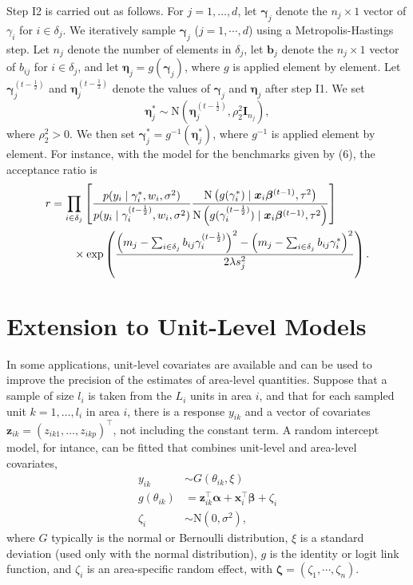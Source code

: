 \documentclass[12pt]{article}
\begin{document}
Step I2 is carried out as follows.  For $j=1,\dotsc,d$, let $\bm{\gamma}_j$ denote the $n_j\times 1$ vector of $\gamma_i$ for $i \in \delta_j$.
We iteratively sample $\bm{\gamma}_j$ ($j=1,\cdots,d$) using a Metropolis-Hastings step.  Let $n_j$ denote the number of elements in $\delta_j$, let $\bm{b}_j$ denote the $n_j\times 1$ vector of $b_{ij}$ for $i \in \delta_j$, and let $\bm{\eta}_j = g(\bm{\gamma}_j)$, where $g$ is applied element by element.  Let $\bm{\gamma}_j^{(t-\frac{1}{2})}$ and $\bm{\eta}_j^{(t-\frac{1}{2})}$ denote the values of $\bm{\gamma}_j$ and $\bm{\eta}_j$ after step I1.  We set
\begin{equation}
  \bm{\eta}_j^* \sim \text{N}(\bm{\eta}_j^{(t-\frac{1}{2})},\rho_2^2 \bm{I}_{n_j}),
\end{equation}
where $\rho_2^2>0$.  We then set $\bm{\gamma}_j^* = g^{-1}(\bm{\eta}_j^*)$, where $g^{-1}$ is applied element by element.  For instance, with the model for the benchmarks given by (6), the acceptance ratio is
\begin{align}\label{eq:aratio_S2}
  r & =\prod_{i \in \delta_j} \left[\frac{ p(y_i \mid \gamma_i^*, w_i, \sigma^2 )}  { p(y_i \mid \gamma_i^{(t-\frac{1}{2})}, w_i, \sigma^2 ) } \frac{ \text{N}\left(g(\gamma_i^*) \mid \bm{x}_i\bm{\beta}^{(t-1)}, \tau^2 \right)}{\text{N}\left(g(\gamma_i^{(t-\frac{1}{2})}) \mid \bm{x}_i\bm{\beta}^{(t-1)}, \tau^2 \right) }\right] \notag \\
  & \quad \quad \times \text{exp}\left( \frac{ \left(m_j-\sum_{i\in\delta_j}b_{ij}\gamma_i^{(t-\frac{1}{2})}\right)^2
  -\left(m_j-\sum_{i\in\delta_j}b_{ij}\gamma_i^*\right)^2}{ 2\lambda s_j^2} \right).
\end{align}


\section{Extension to Unit-Level Models}
  \label{sec:extension-unit}

In some applications, unit-level covariates are available and can be used to improve the precision of the estimates of area-level quantities. Suppose that a sample of size $l_i$ is taken from the $L_i$ units in area $i$, and that for each sampled unit $k = 1, \dots, l_i$ in area $i$, there is a response $y_{ik}$ and a vector of covariates $\bm{z}_{ik}=(z_{ik1},\dots,z_{ikp})^{\top}$, not including the constant term.  A random intercept model, for intance, can be fitted that combines unit-level and area-level covariates,
\begin{align}
\label{eq:unit-yik}  y_{ik} & \sim G( \theta_{ik}, \xi) \\
  g(\theta_{ik})&=\bm{z}_{ik}^{\top}\bm{\alpha} + \bm{x}_i^{\top} \bm{\beta}+\zeta_i\\
  \zeta_i&\sim \text{N}(0,\sigma^2),
\end{align}
where $G$ typically is the normal or Bernoulli distribution, $\xi$ is a standard deviation (used only with the normal distribution), $g$ is the identity or logit link function, and $\zeta_i$ is an area-specific random effect, with $\bm{\zeta}=(\zeta_1,\cdots,\zeta_n)$.
\end{document}

